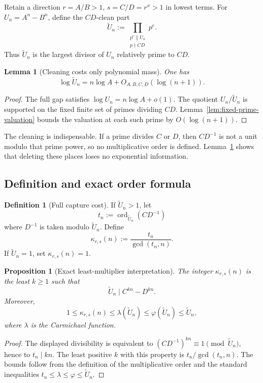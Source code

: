 \documentclass[11pt,oneside]{article}
\newtheorem{proposition}[theorem]{Proposition}
\newtheorem{lemma}[theorem]{Lemma}
\theoremstyle{definition}
\newtheorem{definition}[theorem]{Definition}
\theoremstyle{remark}
\newcommand{\ord}{\operatorname{ord}}
\begin{document}
Retain a direction $r=A/B>1$, $s=C/D=r^x>1$ in lowest terms.  For
$U_n=A^n-B^n$, define the $CD$-clean part
\[
 \widetilde U_n
 :=\prod_{\substack{p^{e}\parallel U_n\\p\nmid CD}}p^e.
\]
Thus $\widetilde U_n$ is the largest divisor of $U_n$ relatively prime to $CD$.

\begin{lemma}[Cleaning costs only polynomial mass]
\label{lem:cleaning}
One has
\[
 \log\widetilde U_n=n\log A+O_{A,B,C,D}(\log(n+1)).
\]
\end{lemma}

\begin{proof}
The full gap satisfies $\log U_n=n\log A+o(1)$.  The quotient
$U_n/\widetilde U_n$ is supported on the fixed finite set of primes dividing $CD$.
Lemma~\ref{lem:fixed-prime-valuation} bounds the valuation at each such prime by
$O(\log(n+1))$.
\end{proof}

The cleaning is indispensable.  If a prime divides $C$ or $D$, then $CD^{-1}$ is not a unit
modulo that prime power, so no multiplicative order is defined.  Lemma~\ref{lem:cleaning}
shows that deleting these places loses no exponential information.

\subsection{Definition and exact order formula}

\begin{definition}[Full capture cost]
\label{def:capture}
If $\widetilde U_n>1$, let
\[
 t_n:=\ord_{\widetilde U_n}(CD^{-1})
\]
where $D^{-1}$ is taken modulo $\widetilde U_n$.  Define
\[
 \kappa_{r,s}(n):=\frac{t_n}{\gcd(t_n,n)}.
\]
If $\widetilde U_n=1$, set $\kappa_{r,s}(n)=1$.
\end{definition}

\begin{proposition}[Exact least-multiplier interpretation]
\label{prop:capture-formula}
The integer $\kappa_{r,s}(n)$ is the least $k\ge1$ such that
\[
 \widetilde U_n\mid C^{kn}-D^{kn}.
\]
Moreover,
\[
 1\le\kappa_{r,s}(n)
 \le \lambda(\widetilde U_n)
 \le \varphi(\widetilde U_n)
 \le \widetilde U_n,
\]
where $\lambda$ is the Carmichael function.
\end{proposition}

\begin{proof}
The displayed divisibility is equivalent to
$(CD^{-1})^{kn}\equiv1\pmod{\widetilde U_n}$, hence to $t_n\mid kn$.  The least positive
$k$ with this property is $t_n/\gcd(t_n,n)$.  The bounds follow from the definition of the
multiplicative order and the standard inequalities $t_n\le\lambda\le\varphi\le\widetilde
U_n$.
\end{proof}
\end{document}
